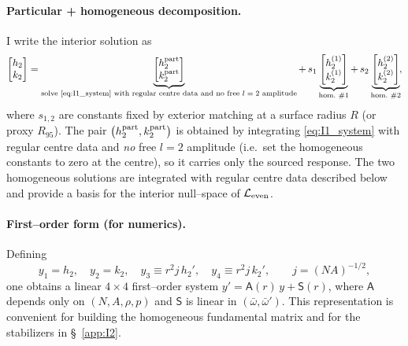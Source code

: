\documentclass{iopjournal}
\begin{document}
\paragraph{Particular + homogeneous decomposition.}
I write the interior solution as
\begin{equation}
\begin{bmatrix}h_2\\ k_2\end{bmatrix}
=
\underbrace{\begin{bmatrix}h_2^{\rm part}\\ k_2^{\rm part}\end{bmatrix}}_{\text{solve \eqref{eq:I1_system} with regular centre data and no free $l=2$ amplitude}}
+\,s_1\underbrace{\begin{bmatrix}h_2^{(1)}\\ k_2^{(1)}\end{bmatrix}}_{\text{hom.\ \#1}}
+\,s_2\underbrace{\begin{bmatrix}h_2^{(2)}\\ k_2^{(2)}\end{bmatrix}}_{\text{hom.\ \#2}}\!,
\label{eq:I1_decomp}
\end{equation}
where $s_{1,2}$ are constants fixed by exterior matching at a surface radius $R$ (or proxy $R_{95}$). The pair $\big(h_2^{\rm part},k_2^{\rm part}\big)$ is obtained by integrating \eqref{eq:I1_system} with regular centre data and \emph{no} free $l=2$ amplitude (i.e.\ set the homogeneous constants to zero at the centre), so it carries only the sourced response. The two homogeneous solutions are integrated with regular centre data described below and provide a basis for the interior null–space of $\mathcal L_{\rm even}$.

\paragraph{First–order form (for numerics).}
Defining
\begin{equation}
y_1=h_2,\quad y_2=k_2,\quad
y_3\equiv r^{2}j\,h_2',\quad y_4\equiv r^{2}j\,k_2',\qquad j=(NA)^{-1/2},
\label{eq:I1_firstorder_vars}
\end{equation}
one obtains a linear $4\times4$ first–order system $y'=\mathsf A(r)\,y+\mathsf S(r)$, where $\mathsf A$ depends only on $(N,A,\rho,p)$ and $\mathsf S$ is linear in $(\bar\omega,\bar\omega')$. This representation is convenient for building the homogeneous fundamental matrix and for the stabilizers in \S\, \cref{app:I2}.
\end{document}
